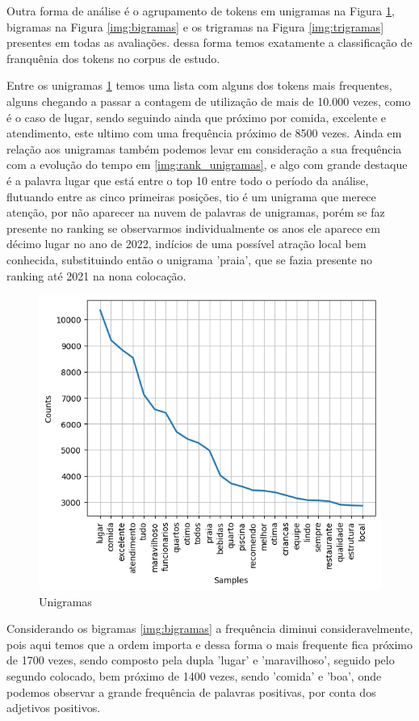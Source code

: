 Outra forma de análise é o agrupamento de tokens em unigramas na Figura \ref{img:unigramas}, bigramas na Figura \ref{img:bigramas} e os trigramas na Figura \ref{img:trigramas} presentes em todas as avaliações. dessa forma temos exatamente a classificação de franquênia dos tokens no corpus de estudo.

Entre os unigramas \ref{img:unigramas} temos uma lista com alguns dos tokens mais frequentes, alguns chegando a passar a contagem de utilização de mais de 10.000 vezes, como é o caso de lugar, sendo seguindo ainda que próximo por comida, excelente e atendimento, este ultimo com uma frequência próximo de 8500 vezes. Ainda em relação aos unigramas também podemos levar em consideração a sua frequência com a evolução do tempo em \ref{img:rank_unigramas}, e algo com grande destaque é a palavra lugar que está entre o top 10 entre todo o período da análise, flutuando entre as cinco primeiras posições, tio é um unigrama que merece atenção, por não aparecer na nuvem de palavras de unigramas, porém se faz presente no ranking se observarmos individualmente os anos ele aparece em décimo lugar no ano de 2022, indícios de uma possível atração local bem conhecida, substituindo então o unigrama 'praia', que se fazia presente no ranking até 2021 na nona colocação.

\begin{figure}
	\centering
	\includegraphics[width=.8\textwidth]{figs/exploratoria/unigramas.png}
	\caption{Unigramas}
	\label{img:unigramas}
\end{figure}

Considerando os bigramas \ref{img:bigramas} a frequência diminui consideravelmente, pois aqui temos que a ordem importa e dessa forma o mais frequente fica próximo de 1700 vezes, sendo composto pela dupla 'lugar' e 'maravilhoso', seguido pelo segundo colocado, bem próximo de 1400 vezes, sendo 'comida' e 'boa', onde podemos observar a grande frequência de palavras positivas, por conta dos adjetivos positivos.

